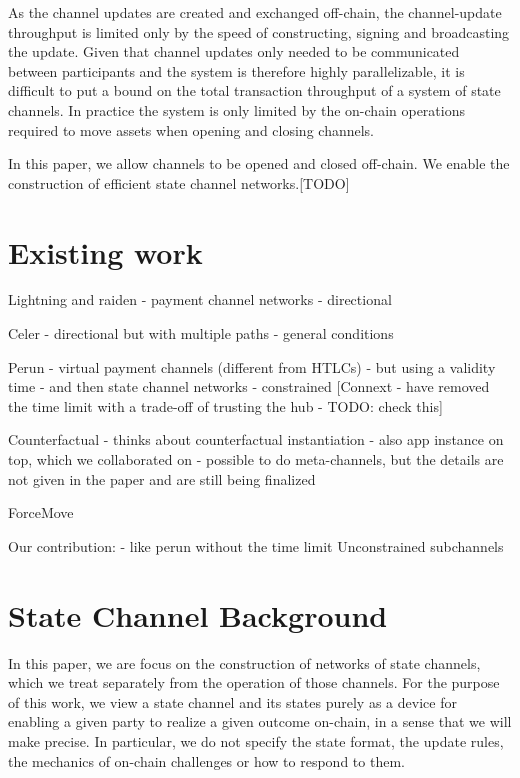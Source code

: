 \documentclass{article}
\theoremstyle{definition}
\begin{document}
As the channel updates are created and exchanged off-chain, the channel-update throughput is limited only by the speed of constructing, signing and broadcasting the update.
Given that channel updates only needed to be communicated between participants and the system is therefore highly parallelizable, it is difficult to put a bound on the total transaction throughput of a system of state channels.
In practice the system is only limited by the on-chain operations required to move assets when opening and closing channels.

In this paper, we allow channels to be opened and closed off-chain. We enable the construction of efficient state channel networks.[TODO]

\section{Existing work}

Lightning and raiden
- payment channel networks
- directional

Celer
- directional but with multiple paths
- general conditions

Perun
- virtual payment channels (different from HTLCs)
- but using a validity time
- and then state channel networks
- constrained
[Connext - have removed the time limit with a trade-off of trusting the hub - TODO: check this]

Counterfactual
- thinks about counterfactual instantiation
- also app instance on top, which we collaborated on
- possible to do meta-channels, but the details are not given in the paper and are still being finalized

ForceMove

Our contribution:
- like perun without the time limit
Unconstrained subchannels

\section{State Channel Background}

In this paper, we are focus on the construction of networks of state channels, which we treat separately from the operation of those channels.
For the purpose of this work, we view a state channel and its states purely as a device for enabling a given party to realize a given outcome on-chain, in a sense that we will make precise.
In particular, we do not specify the state format, the update rules, the mechanics of on-chain challenges or how to respond to them.
\end{document}
